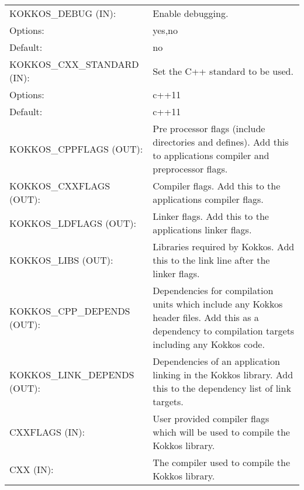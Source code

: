 \begin{table}
\begin{small}
\begin{tabular}[t]{p{}p{}}
\hline
    KOKKOS\_DEBUG (IN): & Enable debugging. \\
      \hspace{0.5cm}Options: & yes,no \\
      \hspace{0.5cm}Default: & no \\

\hline
    KOKKOS\_CXX\_STANDARD (IN): & Set the C++ standard to be used. \\
      \hspace{0.5cm}Options: & c++11 \\
      \hspace{0.5cm}Default: & c++11 \\

\hline\hline

    KOKKOS\_CPPFLAGS (OUT): & Pre processor flags (include directories and defines). 
                              Add this to applications compiler and preprocessor flags. \\

\hline
    KOKKOS\_CXXFLAGS (OUT): & Compiler flags. Add this to the applications compiler flags. \\

\hline
    KOKKOS\_LDFLAGS (OUT): & Linker flags. Add this to the applications linker flags. \\

\hline
    KOKKOS\_LIBS (OUT): & Libraries required by Kokkos. Add this to the link line after the linker flags. \\

\hline
    KOKKOS\_CPP\_DEPENDS (OUT): & Dependencies for compilation units which include any Kokkos header files.
                                  Add this as a dependency to compilation targets including any Kokkos code. \\

\hline
    KOKKOS\_LINK\_DEPENDS (OUT): & Dependencies of an application linking in the Kokkos library.
                                   Add this to the dependency list of link targets. \\
 
\hline\hline
    CXXFLAGS (IN): & User provided compiler flags which will be used to compile the Kokkos library. \\

\hline
    CXX (IN): & The compiler used to compile the Kokkos library. \\
\hline\hline
\end{tabular}
\end{small}
\end{table}

